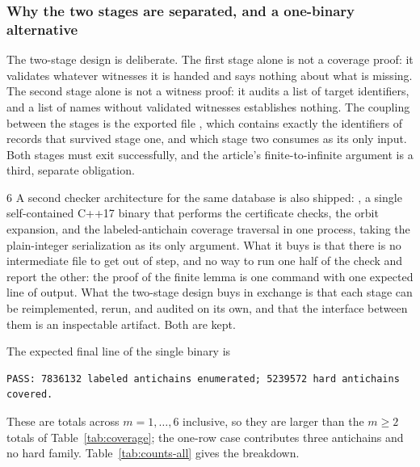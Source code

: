 \documentclass[11pt,letterpaper]{article}
\numberwithin{equation}{section}
\theoremstyle{definition}
\theoremstyle{remark}
\newcommand{\code}[1]{\texttt{\detokenize{#1}}}
\begin{document}
\subsubsection{Why the two stages are separated, and a one-binary alternative}
\label{sec:two-stage}
The two-stage design is deliberate. The first stage alone is not a coverage
proof: it validates whatever witnesses it is handed and says nothing about
what is missing. The second stage alone is not a witness proof: it audits a
list of target identifiers, and a list of names without validated witnesses
establishes nothing. The coupling between the stages is the exported file
, which contains exactly the identifiers of
records that survived stage one, and which stage two consumes as its only
input. Both stages must exit successfully, and the article's finite-to-infinite
argument is a third, separate obligation.

\begin{variantbox}{6}
A second checker architecture for the same database is also shipped:
\code{src/verify_all.cpp}, a single self-contained C++17 binary that performs
the certificate checks, the orbit expansion, and the labeled-antichain
coverage traversal in one process, taking the plain-integer serialization
\code{data/certificates.txt} as its only argument. What it buys is that there
is no intermediate file to get out of step, and no way to run one half of the
check and report the other: the proof of the finite lemma is one command with
one expected line of output. What the two-stage design buys in exchange is
that each stage can be reimplemented, rerun, and audited on its own, and that
the interface between them is an inspectable artifact. Both are kept.
\end{variantbox}

The expected final line of the single binary is
\begin{lstlisting}
PASS: 7836132 labeled antichains enumerated; 5239572 hard antichains covered.
\end{lstlisting}
These are totals across $m=1,\ldots,6$ inclusive, so they are larger than the
$m\ge2$ totals of Table~\ref{tab:coverage}; the one-row case contributes three
antichains and no hard family. Table~\ref{tab:counts-all} gives the breakdown.
\end{document}
